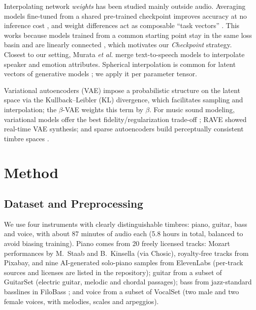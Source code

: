 \documentclass{article}
\begin{document}
Interpolating network \emph{weights} has been studied mainly outside audio.
Averaging models fine-tuned from a shared pre-trained checkpoint improves
accuracy at no inference cost \cite{wortsman2022soups}, and weight differences
act as composable ``task vectors'' \cite{ilharco2023task}. This works because
models trained from a common starting point stay in the same loss basin and are
linearly connected \cite{frankle2020lmc,neyshabur2020transfer}, which motivates
our \emph{Checkpoint} strategy. Closest to our setting, Murata \emph{et al.}
\cite{murata2024attribute} merge text-to-speech models to interpolate speaker and
emotion attributes. Spherical interpolation \cite{shoemake1985slerp} is common
for latent vectors of generative models \cite{white2016sampling}; we apply it
per parameter tensor.

Variational autoencoders (VAE) \cite{kingma2013auto} impose a probabilistic
structure on the latent space via the Kullback--Leibler (KL) divergence, which
facilitates sampling and interpolation; the $\beta$-VAE \cite{higgins2017beta}
weights this term by $\beta$. For music sound modeling, variational models offer
the best fidelity/regularization trade-off
\cite{roche2019autoencodersmusicsoundmodeling}; RAVE \cite{caillon2021rave}
showed real-time VAE synthesis; and sparse autoencoders build perceptually
consistent timbre spaces \cite{riera2017timbre}.

\section{Method}\label{sec:method}

\subsection{Dataset and Preprocessing}
We use four instruments with clearly distinguishable timbres: piano, guitar,
bass and voice, with about 87 minutes of audio each (5.8 hours in
total, balanced to avoid biasing training). Piano comes from 20 freely
licensed tracks: Mozart performances by M.~Staab and B.~Kinsella (via Chosic),
royalty-free tracks from Pixabay, and nine AI-generated solo-piano samples from
ElevenLabs (per-track sources and licenses are listed in the repository); guitar from a subset of GuitarSet \cite{xi2019guitarset}
(electric guitar, melodic and chordal passages); bass from jazz-standard
basslines in FiloBass \cite{riley2023filobass}; and voice from a subset of
VocalSet \cite{wilkins2018vocalset} (two male and two female voices, with
melodies, scales and arpeggios).
\end{document}
